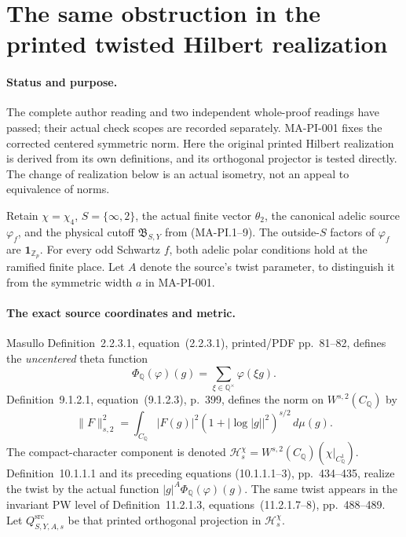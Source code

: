 \section{The same obstruction in the printed twisted Hilbert realization}
\label{sec:printed-projection-obstruction}

\paragraph{Status and purpose.}
The complete author reading and two independent whole-proof
readings have passed; their actual check scopes are recorded separately.  MA-PI-001 fixes the corrected centered
symmetric norm.  Here the original printed Hilbert realization is
derived from its own definitions, and its orthogonal projector is
tested directly.  The change of realization below is an actual
isometry, not an appeal to equivalence of norms.

Retain $\chi=\chi_4$, $S=\{\infty,2\}$, the actual finite vector
$\theta_2$, the canonical adelic source $\varphi_f$, and the
physical cutoff $\mathfrak B_{S,Y}$ from (MA-PI.1--9).
The outside-$S$ factors of $\varphi_f$ are
$\mathbf1_{\mathbb Z_p}$.  For every odd Schwartz $f$, both
adelic polar conditions hold at the ramified finite place.
Let $A$ denote the source's twist parameter, to distinguish it
from the symmetric width $a$ in MA-PI-001.

\paragraph{The exact source coordinates and metric.}
Masullo Definition~2.2.3.1, equation~(2.2.3.1),
printed/PDF pp.~81--82, defines the \emph{uncentered} theta
function
\[
 \Phi_{\mathbb Q}(\varphi)(g)
       =\sum_{\xi\in\mathbb Q^\times}\varphi(\xi g).
 \tag{MA-PI.32}
\]
Definition~9.1.2.1, equation~(9.1.2.3), p.~399, defines
the norm on $W^{s,2}(C_{\mathbb Q})$ by
\[
 \|F\|_{s,2}^2
     =\int_{C_{\mathbb Q}}|F(g)|^2
              (1+|\log|g||^2)^{s/2}\,d\mu(g).
 \tag{MA-PI.33}
\]
The compact-character component is denoted
$\mathcal H_s^\chi=W^{s,2}(C_{\mathbb Q})(\chi|_{C_{\mathbb Q}^1})$.
Definition~10.1.1.1 and its preceding equations
(10.1.1.1--3), pp.~434--435, realize the twist by
the actual function $|g|^A\Phi_{\mathbb Q}(\varphi)(g)$.
The same twist appears in the invariant PW level of
Definition~11.2.1.3, equations~(11.2.1.7--8), pp.~488--489.
Let $Q^{\mathrm{src}}_{S,Y,A,s}$ be that printed
orthogonal projection in $\mathcal H_s^\chi$.


